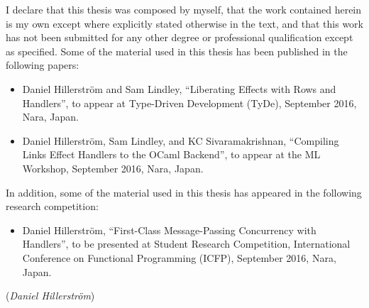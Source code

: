 \documentclass[12pt,mscres,cdtppar,twoside,openright,logo,rightchapter,normalheadings]{infthesis}
\theoremstyle{definition}
\begin{document}
\begin{preliminary}
   \begin{declaration}
     I declare that this thesis was composed by myself, that the work
     contained herein is my own except where explicitly stated
     otherwise in the text, and that this work has not been submitted
     for any other degree or professional qualification except as
     specified. Some of the material used in this thesis has been
     published in the following papers:
     \begin{itemize}
     \item Daniel Hillerström and Sam Lindley, ``Liberating Effects
       with Rows and Handlers'', to appear at Type-Driven Development
       (TyDe), September 2016, Nara, Japan.
     \item Daniel Hillerström, Sam Lindley, and KC Sivaramakrishnan,
       ``Compiling Links Effect Handlers to the OCaml Backend'', to
       appear at the ML Workshop, September 2016, Nara, Japan.
     \end{itemize}
     In addition, some of the material used in this thesis has
     appeared in the following research competition:
     \begin{itemize}
     \item Daniel Hillerström, ``First-Class Message-Passing
       Concurrency with Handlers'', to be presented at Student
       Research Competition, International Conference on Functional
       Programming (ICFP), September 2016, Nara, Japan.
     \end{itemize}
     \vspace{1in}\raggedleft({\em Daniel Hillerström})
   \end{declaration}



\setcounter{secnumdepth}{2} %
\setcounter{tocdepth}{1} %
\tableofcontents

\end{preliminary}
\end{document}

